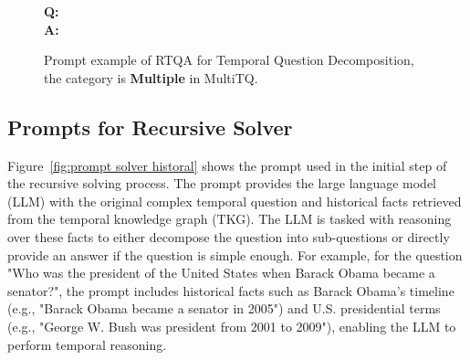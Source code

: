 \documentclass[11pt]{article}
\begin{document}
\begin{figure}[!h]
\begin{tcolorbox}
{\textbf{Q:}  \\
\textbf{A:} 
} %
\end{tcolorbox}
\caption{Prompt example of RTQA for Temporal Question Decomposition, the category is \textbf{Multiple} in MultiTQ.}
\label{fig:prompt before after}
\end{figure}





\subsection{Prompts for Recursive Solver}
\label{A:prompts for solver}
Figure~\ref{fig:prompt solver historal} shows the prompt used in the initial step of the recursive solving process. The prompt provides the large language model (LLM) with the original complex temporal question and historical facts retrieved from the temporal knowledge graph (TKG). The LLM is tasked with reasoning over these facts to either decompose the question into sub-questions or directly provide an answer if the question is simple enough. For example, for the question "Who was the president of the United States when Barack Obama became a senator?", the prompt includes historical facts such as Barack Obama’s timeline (e.g., "Barack Obama became a senator in 2005") and U.S. presidential terms (e.g., "George W. Bush was president from 2001 to 2009"), enabling the LLM to perform temporal reasoning.
\end{document}
